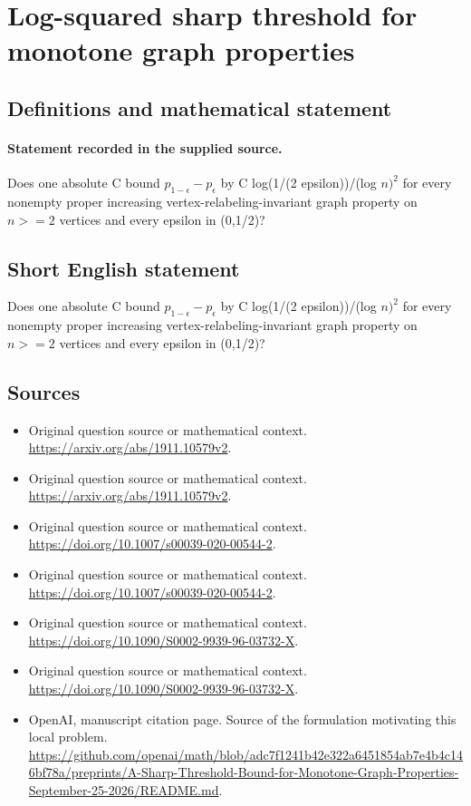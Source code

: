 \documentclass[11pt]{article}
\begin{document}
\section*{Log-squared sharp threshold for monotone graph properties}\label{statement}
\subsection{Definitions and mathematical statement}
\paragraph{Statement recorded in the supplied source.}
Does one absolute C bound $p_{1-\epsilon }-p_\epsilon $ by C log(1/(2 epsilon))/(log $n)^2$ for every nonempty proper increasing vertex-relabeling-invariant graph property on $n>=2$ vertices and every epsilon in (0,1/2)?
\subsection{Short English statement}
Does one absolute C bound $p_{1-\epsilon }-p_\epsilon $ by C log(1/(2 epsilon))/(log $n)^2$ for every nonempty proper increasing vertex-relabeling-invariant graph property on $n>=2$ vertices and every epsilon in (0,1/2)?
\subsection{Sources}
\begin{itemize}
\item[S1] Original question source or mathematical context.
\url{https://arxiv.org/abs/1911.10579v2}.
\item[S2] Original question source or mathematical context.
\url{https://arxiv.org/abs/1911.10579v2}.
\item[S3] Original question source or mathematical context.
\url{https://doi.org/10.1007/s00039-020-00544-2}.
\item[S4] Original question source or mathematical context.
\url{https://doi.org/10.1007/s00039-020-00544-2}.
\item[S5] Original question source or mathematical context.
\url{https://doi.org/10.1090/S0002-9939-96-03732-X}.
\item[S6] Original question source or mathematical context.
\url{https://doi.org/10.1090/S0002-9939-96-03732-X}.
\item[S7] OpenAI, manuscript citation page. Source of the formulation motivating this local problem.
\url{https://github.com/openai/math/blob/adc7f1241b42e322a6451854ab7e4b4c146bf78a/preprints/A-Sharp-Threshold-Bound-for-Monotone-Graph-Properties-September-25-2026/README.md}.
\end{itemize}
\end{document}
